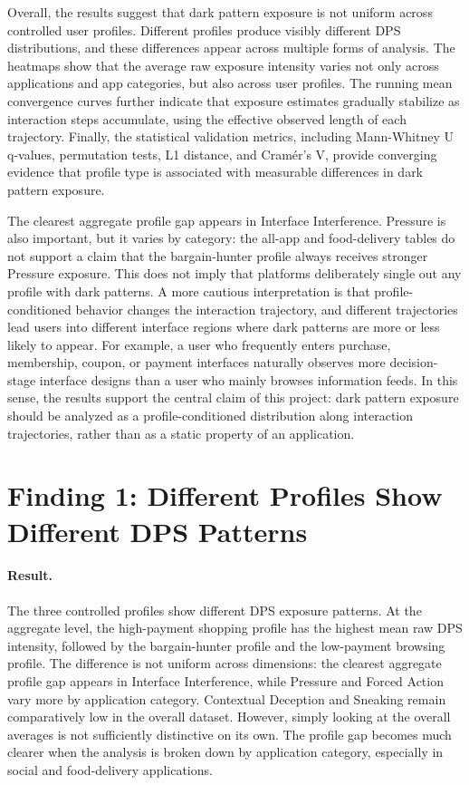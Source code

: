 Overall, the results suggest that dark pattern exposure is not uniform across controlled user profiles. Different profiles produce visibly different DPS distributions, and these differences appear across multiple forms of analysis. The heatmaps show that the average raw exposure intensity varies not only across applications and app categories, but also across user profiles. The running mean convergence curves further indicate that exposure estimates gradually stabilize as interaction steps accumulate, using the effective observed length of each trajectory. Finally, the statistical validation metrics, including Mann-Whitney U q-values, permutation tests, L1 distance, and Cramér's V, provide converging evidence that profile type is associated with measurable differences in dark pattern exposure.

The clearest aggregate profile gap appears in Interface Interference. Pressure is also important, but it varies by category: the all-app and food-delivery tables do not support a claim that the bargain-hunter profile always receives stronger Pressure exposure. This does not imply that platforms deliberately single out any profile with dark patterns. A more cautious interpretation is that profile-conditioned behavior changes the interaction trajectory, and different trajectories lead users into different interface regions where dark patterns are more or less likely to appear. For example, a user who frequently enters purchase, membership, coupon, or payment interfaces naturally observes more decision-stage interface designs than a user who mainly browses information feeds. In this sense, the results support the central claim of this project: dark pattern exposure should be analyzed as a profile-conditioned distribution along interaction trajectories, rather than as a static property of an application.

\section{Finding 1: Different Profiles Show Different DPS Patterns}

\paragraph{Result.}
The three controlled profiles show different DPS exposure patterns. At the aggregate level, the high-payment shopping profile has the highest mean raw DPS intensity, followed by the bargain-hunter profile and the low-payment browsing profile. The difference is not uniform across dimensions: the clearest aggregate profile gap appears in Interface Interference, while Pressure and Forced Action vary more by application category. Contextual Deception and Sneaking remain comparatively low in the overall dataset.
However, simply looking at the overall averages is not sufficiently distinctive on its own. The profile gap becomes much clearer when the analysis is broken down by application category, especially in social and food-delivery applications.

